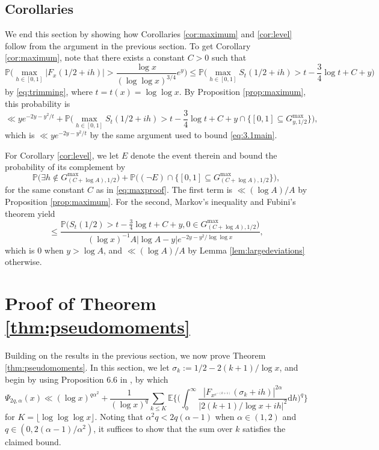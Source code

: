\documentclass{amsart}
\theoremstyle{definition}
\theoremstyle{remark}
\numberwithin{equation}{section}
\begin{document}
\subsection{Corollaries} We end this section by showing how Corollaries \ref{cor:maximum} and \ref{cor:level} follow from the argument in the previous section. To get Corollary \ref{cor:maximum}, note that there exists a constant $C>0$ such that
\begin{equation}\label{eq:maxproof}
        \mathbb{P}\bigg(\max_{h\in [0,1] }|F_x(1/2+ih)|>\frac{\log x}{(\log\log x)^{3/4}}e^y\bigg)\leq \mathbb{P}\bigg(\max_{h\in [0,1]}S_{t}(1/2+ih)>t-\frac{3}{4}\log t+C+y\bigg)
\end{equation}
by \eqref{eq:trimming}, where $t=t(x)=\log\log x$. By Proposition \ref{prop:maximum}, this probability is 
\[
    \ll ye^{-2y-y^2/t}+ \mathbb{P}\bigg(\max_{h\in[0,1]}S_{t}(1/2+ih)>t-\frac{3}{4}\log t+C+y \cap \big\{[0,1]\subseteq  G_{y,1/2}^{\mathrm{max}}\big\}\bigg),
\]
which is $\ll ye^{-2y-y^2/t}$ by the same argument used to bound \eqref{eq:3.1main}.


For Corollary \ref{cor:level}, we let $E$ denote the event therein and bound the probability of its complement by
\[
    \mathbb{P}\big(\exists h\notin  G_{(C+\log A), 1/2}^{\max}\big)+\mathbb{P}\Big((\lnot E)\cap \big\{[0,1]\subseteq G_{(C+\log A), 1/2}^{\max}\big\}\Big),
\]
for the same constant $C$ as in \eqref{eq:maxproof}.
The first term is $\ll (\log A)/A$ by Proposition \ref{prop:maximum}. For the second, Markov's inequality and Fubini's theorem yield
\[
    \leq \frac{\mathbb{P}\Big(S_t(1/2)>t-\frac{3}{4}\log t+C+y, 0\in G_{(C+\log A),1/2}^{\max}\Big)}{(\log x)^{-1}A|\log A-y|e^{-2y-y^2/\log\log x}},
\]
which is $0$ when $y>\log A$, and $\ll (\log A)/A$ by Lemma \ref{lem:largedeviations} otherwise.

\section{Proof of Theorem \ref{thm:pseudomoments}}\label{sec:pseudomoments}

Building on the results in the previous section, we now prove Theorem \ref{thm:pseudomoments}. In this section, we let $\sigma_k:=1/2-2(k+1)/\log x$, and begin by using Proposition 6.6 in \cite{Gerspach}, by which
\[
    \Psi_{2q, \alpha}(x)\ll (\log x)^{q\alpha^2}+\frac{1}{(\log x)^q}\sum_{k\leq K} \mathbb{E}\bigg\{\bigg(\int_{0}^\infty\frac{|F_{x^{e^{-(k+1)}}}(\sigma_k+ih)|^{2\alpha}}{|2(k+1)/\log x+ih|^{2}}\mathrm{d}h\bigg)^q\bigg\}
\]
for $K=\lfloor \log\log\log x\rfloor$. Noting that $\alpha^2q <2q(\alpha-1)$ when $\alpha\in (1,2)$ and $q\in (0,2(\alpha-1)/\alpha^2)$, it suffices to show that the sum over $k$ satisfies the claimed bound.
\end{document}
